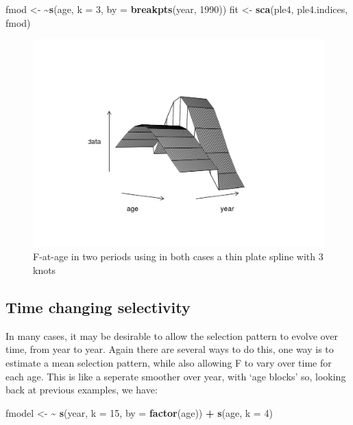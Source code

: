 \documentclass[
]{book}
\newenvironment{Shaded}{\begin{snugshade}}{\end{snugshade}}
\newcommand{\AttributeTok}[1]{\textcolor[rgb]{0.13,0.29,0.53}{#1}}
\newcommand{\DecValTok}[1]{\textcolor[rgb]{0.00,0.00,0.81}{#1}}
\newcommand{\ErrorTok}[1]{\textcolor[rgb]{0.64,0.00,0.00}{\textbf{#1}}}
\newcommand{\FunctionTok}[1]{\textcolor[rgb]{0.13,0.29,0.53}{\textbf{#1}}}
\newcommand{\NormalTok}[1]{#1}
\newcommand{\OtherTok}[1]{\textcolor[rgb]{0.56,0.35,0.01}{#1}}
\newcommand{\SpecialCharTok}[1]{\textcolor[rgb]{0.81,0.36,0.00}{\textbf{#1}}}
\begin{document}
\begin{Shaded}
\begin{Highlighting}[]
\NormalTok{fmod }\OtherTok{\textless{}{-}} \ErrorTok{\textasciitilde{}}\FunctionTok{s}\NormalTok{(age, }\AttributeTok{k =} \DecValTok{3}\NormalTok{, }\AttributeTok{by =} \FunctionTok{breakpts}\NormalTok{(year, }\DecValTok{1990}\NormalTok{))}
\NormalTok{fit }\OtherTok{\textless{}{-}} \FunctionTok{sca}\NormalTok{(ple4, ple4.indices, fmod)}
\end{Highlighting}
\end{Shaded}

\begin{figure}
\centering
\includegraphics{_bookdown_files/_main_files/figure-html/brk-1.png}
\caption{\label{fig:brk}F-at-age in two periods using in both cases a thin plate spline with 3 knots}
\end{figure}

\hypertarget{time-changing-selectivity}{%
\subsection{Time changing selectivity}\label{time-changing-selectivity}}

In many cases, it may be desirable to allow the selection pattern to evolve over time, from year to year. Again there are several ways to do this, one way is to estimate a mean selection pattern, while also allowing F to vary over time for each age. This is like a seperate smoother over year, with `age blocks' so, looking back at previous examples, we have:

\begin{Shaded}
\begin{Highlighting}[]
\NormalTok{fmodel }\OtherTok{\textless{}{-}} \ErrorTok{\textasciitilde{}} \FunctionTok{s}\NormalTok{(year, }\AttributeTok{k =} \DecValTok{15}\NormalTok{, }\AttributeTok{by =} \FunctionTok{factor}\NormalTok{(age)) }\SpecialCharTok{+} \FunctionTok{s}\NormalTok{(age, }\AttributeTok{k =} \DecValTok{4}\NormalTok{)}
\end{Highlighting}
\end{Shaded}
\end{document}
